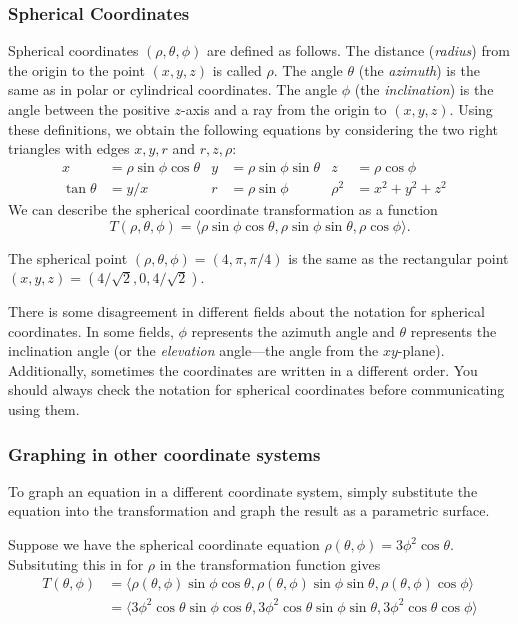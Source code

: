 \subsubsection{Spherical Coordinates}
Spherical coordinates $(\rho,\theta,\phi)$ are defined as follows.
The distance (\emph{radius}) from the origin to the point $(x,y,z)$ is
called $\rho$. The angle $\theta$ (the \emph{azimuth}) is the same as
in polar or cylindrical coordinates. The angle $\phi$ (the
\emph{inclination}) is the angle between the positive $z$-axis and a
ray from the origin to $(x,y,z)$. Using these definitions, we obtain
the following equations by considering the two right triangles with
edges $x,y,r$ and $r,z,\rho$:
\begin{align*}
  x&=\rho\sin\phi\cos\theta  &
  y&=\rho\sin\phi\sin\theta & 
  z&=\rho\cos\phi\\
  \tan\theta&=y/x &
  r&=\rho\sin\phi & 
  \rho^2&=x^2+y^2+z^2 &
\end{align*}
We can describe the spherical coordinate transformation as a
function 
$$T(\rho,\theta,\phi) = \langle\rho\sin\phi\cos\theta,\rho\sin\phi\sin\theta,\rho\cos\phi\rangle.$$ 

\begin{example} 
The spherical point {$(\rho, \theta, \phi)=(4,\pi,\pi/4)$} is the same
as the rectangular point $(x,y,z) = (4/\sqrt{2},0,4/\sqrt{2})$.
\end{example}

There is some disagreement in different fields about the notation for
spherical coordinates.  In some fields, $\phi$ represents the azimuth
angle and $\theta$ represents the inclination angle (or the
\emph{elevation} angle---the angle from the $xy$-plane).
Additionally, sometimes the coordinates are written in a different
order.  You should always check the notation for spherical coordinates
before communicating using them.

\subsubsection{Graphing in other coordinate systems}
To graph an equation in a different coordinate system, simply substitute the equation into the transformation and graph the result as a parametric surface.  

\begin{example}
Suppose we have the spherical coordinate equation $\rho(\theta,\phi)=3\phi^2\cos\theta$.  Subsituting this in for $\rho$ in the transformation function gives 
\begin{align*}
T(\theta,\phi) &= \langle\rho(\theta,\phi)\sin\phi\cos\theta, \rho(\theta,\phi)\sin\phi\sin\theta, \rho(\theta,\phi)\cos\phi\rangle\\
&=\langle3\phi^2\cos\theta\sin\phi\cos\theta, 3\phi^2\cos\theta\sin\phi\sin\theta, 3\phi^2\cos\theta\cos\phi\rangle\\
\end{align*}
\end{example}
 
